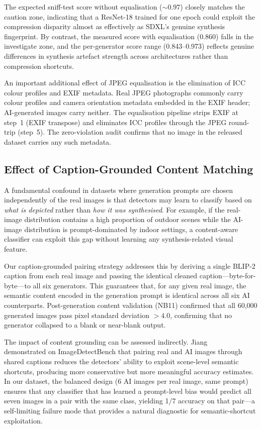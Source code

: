 The expected sniff-test score without equalisation (${\sim}0.97$)
closely matches the caution zone, indicating that a ResNet-18 trained
for one epoch could exploit the compression disparity almost as
effectively as SDXL's genuine synthesis fingerprint.
By contrast, the measured score with equalisation (0.860) falls in
the investigate zone, and the per-generator score range
(0.843--0.973) reflects genuine differences in synthesis artefact
strength across architectures rather than compression shortcuts.

An important additional effect of JPEG equalisation is the
elimination of ICC colour profiles and EXIF metadata.
Real JPEG photographs commonly carry colour profiles and camera
orientation metadata embedded in the EXIF header; AI-generated
images carry neither.
The equalisation pipeline strips EXIF at step~1 (EXIF transpose)
and eliminates ICC profiles through the JPEG round-trip (step~5).
The zero-violation audit confirms that no image in the released
dataset carries any such metadata.

\subsection{Effect of Caption-Grounded Content Matching}
\label{ssec:abl_captions}

A fundamental confound in datasets where generation prompts are
chosen independently of the real images is that detectors may
learn to classify based on \emph{what is depicted} rather than
\emph{how it was synthesised}.
For example, if the real-image distribution contains a high
proportion of outdoor scenes while the AI-image distribution is
prompt-dominated by indoor settings, a content-aware classifier
can exploit this gap without learning any synthesis-related visual
feature.

Our caption-grounded pairing strategy addresses this by deriving
a single BLIP-2 caption from each real image and passing the
identical cleaned caption---byte-for-byte---to all six generators.
This guarantees that, for any given real image, the semantic
content encoded in the generation prompt is identical across all
six AI counterparts.
Post-generation content validation (NB11) confirmed that all
60{,}000 generated images pass pixel standard deviation
$> 4.0$, confirming that no generator collapsed to a blank
or near-blank output.

The impact of content grounding can be assessed indirectly.
Jiang~\etal~\cite{jiang2024passive} demonstrated on
ImageDetectBench that pairing real and AI images through shared
captions reduces the detectors' ability to exploit scene-level
semantic shortcuts, producing more conservative but more
meaningful accuracy estimates.
In our dataset, the balanced design (6 AI images per real image,
same prompt) ensures that any classifier that has learned a
prompt-level bias would predict all seven images in a pair with
the same class, yielding 1/7 accuracy on that pair---a
self-limiting failure mode that provides a natural diagnostic
for semantic-shortcut exploitation.

